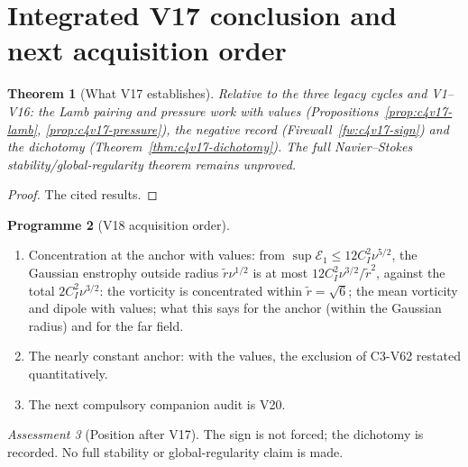 \documentclass[11pt]{article}
\theoremstyle{plain}
\newtheorem{theorem}{Theorem}[section]
\theoremstyle{definition}
\newtheorem{programme}[theorem]{Programme}
\theoremstyle{remark}
\newtheorem{assessment}[theorem]{Assessment}
\begin{document}
\section{Integrated V17 conclusion and next acquisition order}
\label{sec:c4v17-conclusion}

\begin{theorem}[What V17 establishes]
\label{thm:c4v17-conclusion}
Relative to the three legacy cycles and V1--V16: the Lamb pairing and
pressure work with values (Propositions~\ref{prop:c4v17-lamb},
\ref{prop:c4v17-pressure}), the negative record (Firewall~\ref{fw:c4v17-sign})
and the dichotomy (Theorem~\ref{thm:c4v17-dichotomy}).  The full
Navier--Stokes stability/global-regularity theorem remains
unproved.
\end{theorem}

\begin{proof}
The cited results.
\end{proof}

\begin{programme}[V18 acquisition order]
\label{prog:c4v18}
\begin{enumerate}[label=\textup{(AC\arabic*)},leftmargin=4.8em]
\item Concentration at the anchor with values: from \(\sup\mathcal E_1\le12C_I^2\nu^{5/2}\),
      the Gaussian enstrophy outside radius \(\tilde r\nu^{1/2}\) is at most
      \(12C_I^2\nu^{3/2}/\tilde r^2\), against the total \(2C_I^2\nu^{3/2}\): the vorticity is
      concentrated within \(\tilde r=\sqrt6\); the mean vorticity and dipole
      with values; what this says for the anchor (within the Gaussian
      radius) and for the far field.
\item The nearly constant anchor: with the values, the exclusion of
      C3-V62 restated quantitatively.
\item The next compulsory companion audit is V20.
\end{enumerate}
\end{programme}

\begin{assessment}[Position after V17]
\label{ass:c4v17-position}
The sign is not forced; the dichotomy is recorded.  No full
stability or global-regularity claim is made.
\end{assessment}

\end{document}
